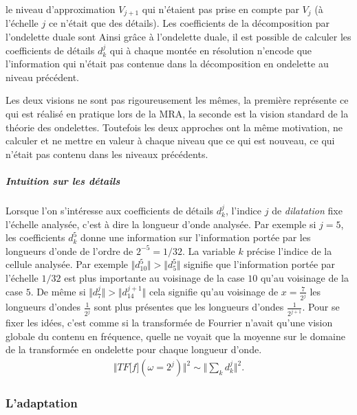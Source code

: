             le niveau d'approximation $V_{j+1}$ qui n'étaient pas prise en compte par $V_j$ (à l'échelle $j$ ce n'était que des détails). 
            Les coefficients de la décomposition par l'ondelette duale sont  Ainsi grâce à l'ondelette duale, 
            il est possible de calculer les coefficients de détails $d_k^j$ qui à chaque montée en résolution n'encode que l'information qui n'était 
            pas contenue dans la décomposition en ondelette au niveau précédent.\par
            Les deux visions ne sont pas rigoureusement les mêmes, la première représente ce qui est réalisé en pratique lors de la MRA, la seconde 
            est la vision standard de la théorie des ondelettes. Toutefois les deux approches ont la même motivation, ne calculer et ne mettre en valeur à chaque
            niveau que ce qui est nouveau, ce qui n'était pas contenu dans les niveaux précédents.
        
        \subparagraph{Intuition sur les détails}
            Lorsque l'on s'intéresse aux coefficients de détails $d_k^j$,
            l'indice $j$ de \textit{dilatation} fixe l'échelle analysée, c'est à dire la longueur d'onde analysée. Par exemple si $j=5$, 
            les coefficients $d^5_k$ donne une information sur l'information portée par les longueurs d'onde de l'ordre de $2^{-5} = 1/32$.
            La variable $k$ précise l'indice de la cellule analysée.
            Par exemple $\Vert d^5_10 \Vert > \Vert d^5_5 \Vert$ signifie que l'information portée par l'échelle $1/32$
            est plus importante au voisinage de la case $10$ qu'au voisinage de la case $5$.
            De même si $\Vert d^j_7 \Vert > \Vert d^{j+1}_{14} \Vert$ cela signifie qu'au voisinage de $x=\frac{7}{2^j}$
            les longueurs d'ondes $\frac{1}{2^j}$ sont plus présentes que les longueurs d'ondes $\frac{1}{2^{j+1}}.$
            Pour se fixer les idées, c'est comme si la transformée de Fourrier n'avait qu'une vision globale du contenu en fréquence, 
            quelle ne voyait que la moyenne sur le domaine de la transformée en ondelette pour chaque longueur d'onde.
            \begin{align}
                \Vert TF\bigl[ f \bigr](\omega = 2^j) \Vert^2 \sim \Vert \sum_{k} d^j_k \Vert^2.
            \end{align}
\subsubsection{L'adaptation}\label{par:adaptation}
